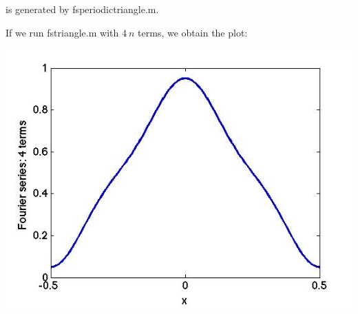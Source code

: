 \documentclass{article}
\begin{document}
\noindent is generated by fs\textunderscore periodictriangle.m.

If we run fs\textunderscore triangle.m with $ 4 \ n $ terms, we obtain the plot:
\begin{center}
\includegraphics[scale=0.5]{fs_triangle4.jpg}
\end{center}
\end{document}
